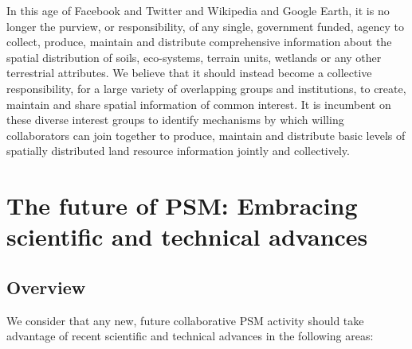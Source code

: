 \documentclass[graybox,natbib,nospthms,UStrade]{svmono}
\begin{document}
In this age of Facebook and Twitter and Wikipedia and Google Earth, it
is no longer the purview, or responsibility, of any single, government
funded, agency to collect, produce, maintain and distribute
comprehensive information about the spatial distribution of soils,
eco-systems, terrain units, wetlands or any other terrestrial
attributes. We believe that it should instead become a collective
responsibility, for a large variety of overlapping groups and
institutions, to create, maintain and share spatial information of
common interest. It is incumbent on these diverse interest groups to
identify mechanisms by which willing collaborators can join together to
produce, maintain and distribute basic levels of spatially distributed
land resource information jointly and collectively.

\hypertarget{the-future-of-psm-embracing-scientific-and-technical-advances}{%
\section{The future of PSM: Embracing scientific and technical advances}\label{the-future-of-psm-embracing-scientific-and-technical-advances}}

\hypertarget{overview}{%
\subsection{Overview}\label{overview}}

We consider that any new, future collaborative PSM activity should take
advantage of recent scientific and technical advances in the following
areas:
\end{document}
